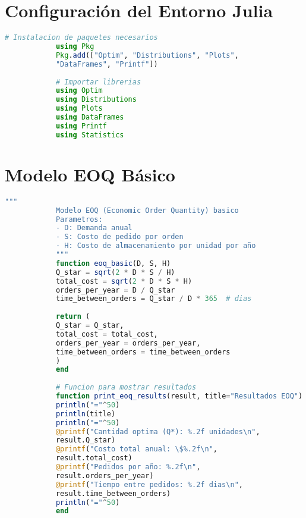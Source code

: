 \documentclass[12pt,a4paper]{book}
\begin{document}
	\section{Configuraci\'on del Entorno Julia}
	
	\begin{tcolorbox}[enhanced,colback=grisclaro,colframe=juliacolor,boxrule=2pt,arc=8pt,
		drop shadow,title={\bfseries\color{white} \faCode\ PAQUETES NECESARIOS}]
		
		\begin{lstlisting}[language=Julia,basicstyle=\footnotesize\ttfamily]
			# Instalacion de paquetes necesarios
			using Pkg
			Pkg.add(["Optim", "Distributions", "Plots", 
			"DataFrames", "Printf"])
			
			# Importar librerias
			using Optim
			using Distributions
			using Plots
			using DataFrames
			using Printf
			using Statistics
		\end{lstlisting}
		
	\end{tcolorbox}
	
	\section{Modelo EOQ B\'asico}
	
	\begin{tcolorbox}[enhanced,colback=azulclaro,colframe=azulprincipal,boxrule=3pt,arc=12pt,
		drop shadow,title={\Large\bfseries\color{white} \faLightbulb\ IMPLEMENTACI\'ON EOQ}]
		
		\begin{lstlisting}[language=Julia,basicstyle=\footnotesize\ttfamily]
			"""
			Modelo EOQ (Economic Order Quantity) basico
			Parametros:
			- D: Demanda anual
			- S: Costo de pedido por orden
			- H: Costo de almacenamiento por unidad por año
			"""
			function eoq_basic(D, S, H)
			Q_star = sqrt(2 * D * S / H)
			total_cost = sqrt(2 * D * S * H)
			orders_per_year = D / Q_star
			time_between_orders = Q_star / D * 365  # dias
			
			return (
			Q_star = Q_star,
			total_cost = total_cost,
			orders_per_year = orders_per_year,
			time_between_orders = time_between_orders
			)
			end
			
			# Funcion para mostrar resultados
			function print_eoq_results(result, title="Resultados EOQ")
			println("="^50)
			println(title)
			println("="^50)
			@printf("Cantidad optima (Q*): %.2f unidades\n", 
			result.Q_star)
			@printf("Costo total anual: \$%.2f\n", 
			result.total_cost)
			@printf("Pedidos por año: %.2f\n", 
			result.orders_per_year)
			@printf("Tiempo entre pedidos: %.2f dias\n", 
			result.time_between_orders)
			println("="^50)
			end
		\end{lstlisting}
		
	\end{tcolorbox}
	
\end{document}
